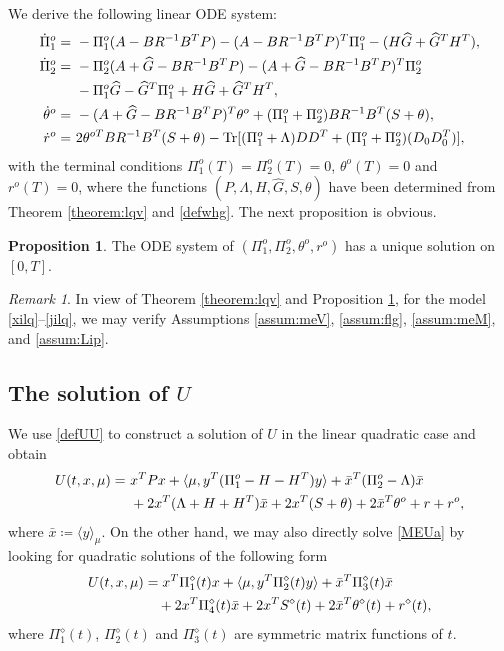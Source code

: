 \documentclass{amsart}
\theoremstyle{definition}
\newtheorem{proposition}[theorem]{Proposition}
\theoremstyle{remark}
\newtheorem{remark}[theorem]{Remark}
\numberwithin{equation}{section}
\begin{document}
We derive the following linear ODE system:
\begin{align*}
\dot\Pi_1^o =\ &-\Pi_1^o (A-BR^{-1}B^T P) -(A-BR^{-1}B^T P)^T \Pi_1^{o}  - (H\widehat G +\widehat G^TH^T),\\
\dot \Pi_2^o =\ & - \Pi_2^o (A+\widehat G-BR^{-1}B^TP) - (A+\widehat G-BR^{-1}B^TP)^T \Pi_2^o\\
& - \Pi_1^o\widehat G - \widehat G^T \Pi_1^o +H\widehat G +\widehat G^T
H^T, \\
\dot \theta^o =\ &  - (A+\widehat G-  BR^{-1}B^TP)^T \theta^o+
(\Pi_1^o+\Pi_2^o)BR^{-1}B^T (S+\theta),\\
 \dot r^o =\ &  2\theta^{oT} BR^{-1}B^T (S+\theta) - {\rm Tr}[ (\Pi_1^o+\Lambda) DD^T + (\Pi_1^o+\Pi_2^o)(D_0D_0^T)] ,
\end{align*}
with the terminal conditions
$\Pi_1^o(T)=\Pi_2^o(T)=0$, $ \theta^o(T)=0$ and $  r^o(T)=0$, where
the functions $(P,\Lambda, H, \widehat G, S, \theta )$ have been determined from Theorem \ref{theorem:lqv} and \eqref{defwhg}.
The next proposition is obvious.
\begin{proposition}\label{prop:M}
The ODE system of $(\Pi_1^o,\Pi_2^o, \theta^o, r^o)$ has a unique solution on
$[0,T]$.
\end{proposition}

\begin{remark}
In view of  Theorem \ref{theorem:lqv} and Proposition \ref{prop:M},
for the model \eqref{xilq}--\eqref{jilq}, we may verify Assumptions
\ref{assum:meV}, \ref{assum:flg}, \ref{assum:meM}, and \ref{assum:Lip}.
\end{remark}


\subsection{The solution of $ U$}

We use \eqref{defUU} to construct a solution of $U$
in the linear quadratic case  and obtain
\begin{align}
U(t,x,\mu)=\ & x^TPx+ \langle \mu, y^T (\Pi_1^o -H-H^T) y  \rangle +\bar x^T (\Pi_2^o - \Lambda)\bar x \label{ULQ} \\
&+ 2x^T (\Lambda+H+H^T)\bar x +2x^T(S+\theta)+2\bar x^T \theta^o + r+r^o, \notag
\end{align}
where $ \bar x \coloneqq \langle y\rangle_\mu   $.
On the other hand, we may also directly solve \eqref{MEUa} by looking for quadratic solutions of the following form
\begin{align}
 U(t, x, \mu) & =   x^T \Pi_1^\diamond(t) x + \langle \mu, y^T \Pi_2^\diamond(t) y\rangle+
 \bar x^T \Pi_3^\diamond(t) \bar x  \label{ULQ2} \\
& \quad + 2x^T \Pi_4^\diamond(t) \bar x+ 2 x^T S^\diamond(t) +  2\bar x^T \theta^\diamond(t) +r^\diamond(t),\notag
\end{align}
where $\Pi_1^\diamond(t)$, $\Pi_2^\diamond(t)$ and $\Pi_3^\diamond(t) $
 are symmetric matrix functions of $t$.
\end{document}
